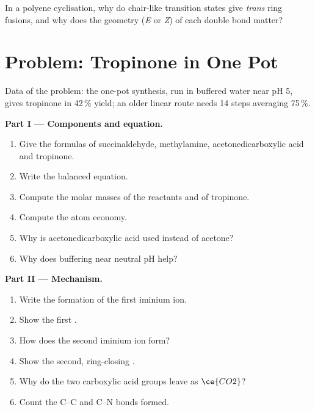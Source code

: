\begin{exercise}[$\star\star\star$]\label{exo:b3:total-synthesis:12}
In a polyene cyclisation, why do chair-like transition states give \textit{trans} ring
fusions, and why does the geometry (\textit{E} or \textit{Z}) of each double bond matter?
\end{exercise}

\section{Problem: Tropinone in One Pot}

\begin{problem}
\label{pb:b3:total-synthesis:1}
Data of the problem: the one-pot synthesis, run in buffered water near pH 5,
gives tropinone in 42\,\% yield; an older linear route needs 14 steps averaging 75\,\%.

\medskip\noindent\textbf{Part I --- Components and equation.}
\begin{enumerate}
  \item Give the formulas of succinaldehyde, methylamine, acetonedicarboxylic acid
        and tropinone.
  \item Write the balanced equation.
  \item Compute the molar masses of the reactants and of tropinone.
  \item Compute the atom economy.
  \item Why is acetonedicarboxylic acid used instead of acetone?
  \item Why does buffering near neutral pH help?
\end{enumerate}

\medskip\noindent\textbf{Part II --- Mechanism.}
\begin{enumerate}[resume]
  \item Write the formation of the first iminium ion.
  \item Show the first .
  \item How does the second iminium ion form?
  \item Show the second, ring-closing .
  \item Why do the two carboxylic acid groups leave as $\ce{CO2}$?
  \item Count the C--C and C--N bonds formed.
\end{enumerate}


\end{problem}
